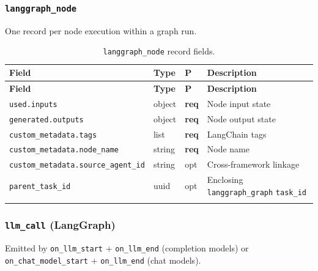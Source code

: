 \documentclass[11pt,a4paper]{article}
\newcommand{\opt}{\textcolor{optred}{opt}}
\newcommand{\req}{\textbf{req}}
\newcommand{\subtype}[1]{\texttt{\textcolor{subtypeblue}{#1}}}
\begin{document}
\subsubsection{\subtype{langgraph\_node}}

One record per node execution within a graph run.

\begin{longtable}{L{4cm} L{2.5cm} C{1.2cm} L{6.5cm}}
\toprule
\textbf{Field} & \textbf{Type} & \textbf{P} & \textbf{Description} \\
\midrule
\endfirsthead
\toprule \textbf{Field} & \textbf{Type} & \textbf{P} & \textbf{Description} \\
\midrule
\endhead
\bottomrule
\endlastfoot

\texttt{used.inputs}            & object & \req & Node input state \\
\texttt{generated.outputs}      & object & \req & Node output state \\
\texttt{custom\_metadata.tags}  & list   & \req & LangChain tags \\
\texttt{custom\_metadata.node\_name}       & string & \req & Node name \\
\texttt{custom\_metadata.source\_agent\_id}& string & \opt & Cross-framework linkage \\
\texttt{parent\_task\_id}       & uuid   & \opt & Enclosing \subtype{langgraph\_graph} \texttt{task\_id} \\

\caption{\subtype{langgraph\_node} record fields.}
\end{longtable}

\subsubsection{\subtype{llm\_call} (LangGraph)}

Emitted by \texttt{on\_llm\_start} + \texttt{on\_llm\_end} (completion models)
or \texttt{on\_chat\_model\_start} + \texttt{on\_llm\_end} (chat models).
\end{document}
